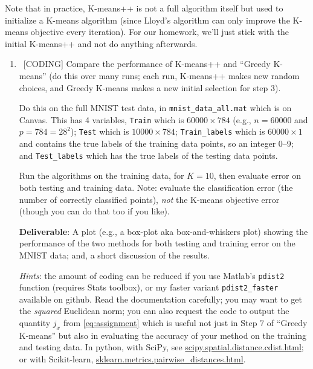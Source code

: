 \documentclass[10pt, letterpaper]{scrartcl}
\begin{document}
Note that in practice, K-means++ is not a full algorithm itself but used to initialize a K-means algorithm (since Lloyd's algorithm can only improve the K-means objective every iteration). For our homework, we'll just stick with the initial K-means++ and not do anything afterwards. 



\begin{enumerate}[align=left, leftmargin=*, label=\sffamily\bfseries Problem \arabic*:]   
 
    \item \ [CODING] Compare the performance of K-means++ and ``Greedy K-means'' (do this over many runs; each run, K-means++ makes new random choices, and Greedy K-means makes a new initial selection for step 3).
    
    Do this on the full MNIST test data, in \texttt{mnist\_data\_all.mat} which is on Canvas.
    This has 4 variables, \texttt{Train} which is $60000 \times 784$ (e.g., $n=60000$ and $p=784=28^2$); 
    \texttt{Test} which is $10000 \times 784$; \texttt{Train\_labels} which is $60000 \times 1$ and contains the true labels of the training data points, so an integer 0--9; and \texttt{Test\_labels} which has the true labels of the testing data points.
    
    Run the algorithms on the training data, for $K=10$, then evaluate error on both testing and training data. Note: evaluate the classification error (the number of correctly classified points), \emph{not} the K-means objective error (though you can do that too if you like).

    
    \textbf{Deliverable}: A plot (e.g., a box-plot aka box-and-whiskers plot) showing the performance of the two methods for both testing and training error on the MNIST data; and, a short discussion of the results.
    
    \emph{Hints}: the amount of coding can be reduced if you use Matlab's \texttt{pdist2} function (requires Stats toolbox), or my faster variant \texttt{pdist2\_faster} available on github. Read the documentation carefully; you may want to get the \emph{squared} Euclidean norm; you can also request the code to output the quantity $j_x$ from \eqref{eq:assignment} which is useful not just in Step 7 of ``Greedy K-means'' but also in evaluating the accuracy of your method on the training and testing data.  In python, with SciPy, see  \href{https://docs.scipy.org/doc/scipy-0.14.0/reference/generated/scipy.spatial.distance.cdist.html}{scipy.spatial.distance.cdist.html}; or with Scikit-learn, \href{https://scikit-learn.org/stable/modules/generated/sklearn.metrics.pairwise_distances.html}{sklearn.metrics.pairwise\_distances.html}.
    

\end{enumerate}
\end{document}
